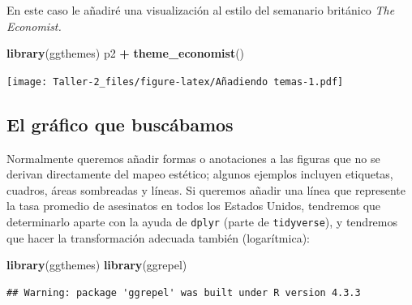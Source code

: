 \documentclass[
]{article}
\newenvironment{Shaded}{\begin{snugshade}}{\end{snugshade}}
\newcommand{\FunctionTok}[1]{\textcolor[rgb]{0.13,0.29,0.53}{\textbf{#1}}}
\newcommand{\NormalTok}[1]{#1}
\newcommand{\SpecialCharTok}[1]{\textcolor[rgb]{0.81,0.36,0.00}{\textbf{#1}}}
\begin{document}
En este caso le añadiré una visualización al estilo del semanario
británico \emph{The Economist.}

\begin{Shaded}
\begin{Highlighting}[]
\FunctionTok{library}\NormalTok{(ggthemes)}
\NormalTok{p2 }\SpecialCharTok{+} \FunctionTok{theme\_economist}\NormalTok{()}
\end{Highlighting}
\end{Shaded}

\texttt{[image: Taller-2\_files/figure-latex/Añadiendo temas-1.pdf]}

\subsection{El gráfico que
buscábamos}\label{el-gruxe1fico-que-buscuxe1bamos}

Normalmente queremos añadir formas o anotaciones a las figuras que no se
derivan directamente del mapeo estético; algunos ejemplos incluyen
etiquetas, cuadros, áreas sombreadas y líneas. Si queremos añadir una
línea que represente la tasa promedio de asesinatos en todos los Estados
Unidos, tendremos que determinarlo aparte con la ayuda de \texttt{dplyr}
(parte de \texttt{tidyverse}), y tendremos que hacer la transformación
adecuada también (logarítmica):

\begin{Shaded}
\begin{Highlighting}[]
\FunctionTok{library}\NormalTok{(ggthemes)}
\FunctionTok{library}\NormalTok{(ggrepel)}
\end{Highlighting}
\end{Shaded}

\begin{verbatim}
## Warning: package 'ggrepel' was built under R version 4.3.3
\end{verbatim}
\end{document}
